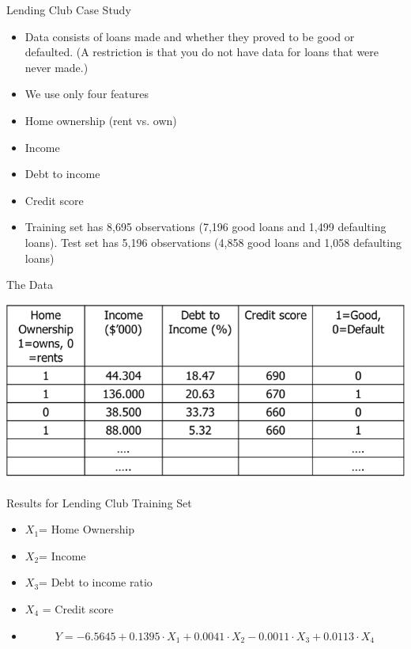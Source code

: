 \documentclass[11pt]{beamer}
\begin{document}
\begin{frame}{Lending Club Case Study}
	\begin{itemize}
		\item Data consists of loans made and whether they proved to be good or defaulted. (A restriction is that you do not have data for loans that were never made.)
		\item We use only four features
		\item Home ownership (rent vs. own)
		\item Income
		\item Debt to income
		\item Credit score
		\item Training set has 8,695 observations (7,196 good loans and 1,499 defaulting loans). Test set has 5,196 observations (4,858 good loans and 1,058 defaulting loans)
	\end{itemize}
\end{frame}
\begin{frame}{The Data}
	\begin{center}
	\includegraphics[scale=0.5]{../05-pictures/lesson-3-1_pic_11.png}
	\end{center}
\end{frame}
\begin{frame}{Results for Lending Club Training Set}
	\begin{itemize}
		\item $X_1$= Home Ownership
		\item $X_2$= Income
		\item $X_3$= Debt to income ratio
		\item $X_4$ = Credit score
		\item $$Y=-6.5645+0.1395\cdot X_1+0.0041\cdot X_2-0.0011\cdot X_3+0.0113\cdot X_4$$
	\end{itemize}
\end{frame}
\end{document}
